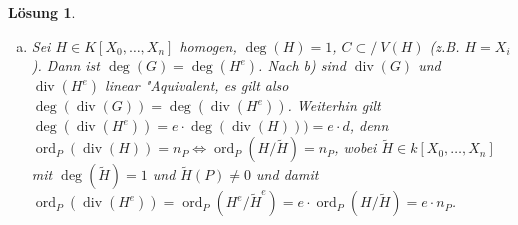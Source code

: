 \documentclass[a4paper, 12pt, numbers=noendperiod, chapterprefix=true, headsepline]{scrbook}
\theoremstyle{break}
\newtheorem{Loes}{L\"osung}
\theoremstyle{nonumberbreak}
\theoremstyle{nonumberplain}
\newcommand{\quot}[1]{\textrm{\glqq}{#1}\textrm{\grqq}}
\newcommand{\isom}{\cong}
\DeclareMathOperator{\id}{id}
\DeclareMathOperator{\Quot}{Quot}
\DeclareMathOperator{\Divisor}{div}
\DeclareMathOperator{\ord}{ord}
\newcommand{\A}{\mathbb{A}}
\newcommand{\IP}{\mathbb{P}}%
\newcommand{\nsubset}{\subset\!\!\!\!\!/~}
\begin{document}
\begin{Loes}
\begin{enumerate}[a)]
	Aus Behauptung 1 und 2 folgt dann wie gew"unscht 
		\[d = \deg(\Divisor(X)) = \deg(h^\ast((0:1))) = \sum_{h(P) = (0:1)} e_P(h) = \deg h = \deg F \, .\]

	\emph{Beweis Beh. 2:} Nach Definition gilt $\deg h = [k(C) : k(\IP^1(k))]$. Betrachte die Einschr"ankung $h^a$ von $h$ auf $C^a = C \cap D(Y)$ nach $\IP^1(k) \cap D(Y) = \A^1(k)$. Der Morphismus $h^a: C^a \to \A^1(k), (x:1:z) \mapsto x$ induziert einen Morphismus $(h^a)^\sharp: k(\A^1(k)) = k(X) \hookrightarrow k(C^a) = k(x,z), X \mapsto x$, wobei $x$ und $z$ die Restklassen von $X$ und $Z$ in $k[C^a]$ bezeichnen. 
 
	Das Bild von $(h^a)^\sharp$ ist $k(x)$ und f"ur $z$ gilt $F(x,1,z) = 0$. Sei $m$ der Grad von $F$ und $F = \sum_{i+j+k=m} a_{ijk} X^i Y^j Z ^k$. Wegen $(0:0:1) \notin C$ ist $a_{00m} \neq 0$ und die Dehomogenisierung von $F$ nach $Y$, $f := F(X,1,Z)$, hat Grad $m$ in $Z$. Da $F$ irreduzibel in $k[X,Y,Z]$ ist, ist auch $f$ irreduzibel in $k[X,Z]$. Eine einfache Folgerung aus dem Lemma von Gau\ss \footnote{siehe Hilfssatz 2.2.6 in \quot{Algebra im WS 2011/2012} von Dr. Stefan K"uhnlein} sagt, dass dann $f$ auch "uber $k(X)[Z]$ irreduzibel ist. Wegen $C^a = V(f)$, gilt $k(C^a) = \Quot(k[X,Z]/(f)) \isom k(X)[Z] / (f)$ und somit $\deg h^a  = [k(C^a) : k(X)] = \deg f $.
	
	Die Inklusion $C^a \hookrightarrow C$ hat eine dominante rationale Umkehrabbildung $\id \colon C \dashrightarrow C^a$. Daher ist $k(C^a ) \isom k(C)$. Genauso ist auch $k(\IP^1(k)) \isom k(\A^1(k))$ und es folgt $\deg h = [k(C) : k(\IP^1(k))] = [k(C^a) : k(\A^1(k))] = \deg h^a$. Insgesamt gilt $\deg F = \deg f = \deg h^a = \deg h$.
\item
	Sei $H \in K[X_0, \dots, X_n]$ homogen, $\deg(H) = 1$, $C \nsubset V(H)$ (z.B. $H = X_i$). Dann ist $\deg(G) = \deg(H^e)$. Nach b) sind $\Divisor(G)$ und $\Divisor(H^e)$ linear "Aquivalent, es gilt also $\deg(\Divisor(G)) = \deg(\Divisor(H^e))$. Weiterhin gilt $\deg(\Divisor(H^e)) = e \cdot \deg(\Divisor(H))) = e \cdot d$, denn $\ord_P(\Divisor(H)) = n_P \Leftrightarrow \ord_P(H / \tilde{H}) = n_P$, wobei $\tilde{H} \in k[X_0, \dots, X_n]$ mit $\deg(\tilde{H}) = 1$ und $\tilde{H}(P) \neq 0$ und damit $\ord_P(\Divisor(H^e)) = \ord_P(H^e / \tilde{H}^e) = e \cdot \ord_P(H / \tilde{H}) = e \cdot n_P$.
\end{enumerate}\end{Loes}


\end{document}
